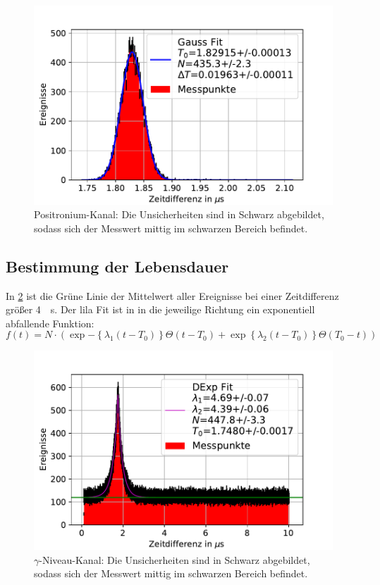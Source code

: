 \documentclass[
	a4paper,
	12pt,
	pagesize,
	ngerman
]{scrartcl}
\begin{document}
	\begin{figure}[H]
				\includegraphics[width= 0.9 \linewidth]{img/Positronium_Zeitdifferenz_zoom}
				\caption{
					Positronium-Kanal:
				Die Unsicherheiten sind in Schwarz abgebildet, sodass sich der Messwert mittig im schwarzen Bereich befindet.
				}
				\label{fig_positronium_zeitdifferenzen_zoom}
		\end{figure}

		\subsection{Bestimmung der Lebensdauer}
		In \cref{fig_zeitdifferenz} ist die Grüne Linie der Mittelwert aller Ereignisse bei einer Zeitdifferenz größer \SI{4}{\mu s}.
		Der lila Fit ist in in die jeweilige Richtung ein exponentiell abfallende Funktion:
		\begin{equation}
			\label{eq_dexp}
			f(t)=N\cdot (\exp{-\left\{\lambda_1(t-T_0)\right\}}\Theta(t-T_0)+\exp{\left\{\lambda_2(t-T_0)\right\}}\Theta(T_0-t))
		\end{equation}
	\begin{figure}[H]
				\includegraphics[width= 0.9 \linewidth]{img/Zeitdifferenzen}
				\caption{
					$\gamma$-Niveau-Kanal:
				Die Unsicherheiten sind in Schwarz abgebildet, sodass sich der Messwert mittig im schwarzen Bereich befindet.
				}
				\label{fig_zeitdifferenz}
		\end{figure}
\end{document}
